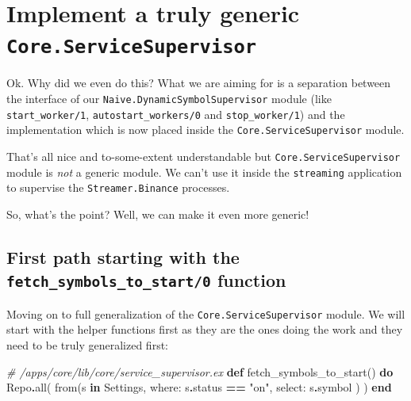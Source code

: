 \documentclass[
  oneside]{book}
\newenvironment{Shaded}{\begin{snugshade}}{\end{snugshade}}
\newcommand{\CommentTok}[1]{\textcolor[rgb]{0.56,0.35,0.01}{\textit{#1}}}
\newcommand{\ConstantTok}[1]{\textcolor[rgb]{0.00,0.00,0.00}{#1}}
\newcommand{\KeywordTok}[1]{\textcolor[rgb]{0.13,0.29,0.53}{\textbf{#1}}}
\newcommand{\NormalTok}[1]{#1}
\newcommand{\OperatorTok}[1]{\textcolor[rgb]{0.81,0.36,0.00}{\textbf{#1}}}
\newcommand{\StringTok}[1]{\textcolor[rgb]{0.31,0.60,0.02}{#1}}
\newcommand{\VariableTok}[1]{\textcolor[rgb]{0.00,0.00,0.00}{#1}}
\begin{document}
\hypertarget{implement-a-truly-generic-core.servicesupervisor}{%
\section{\texorpdfstring{Implement a truly generic \texttt{Core.ServiceSupervisor}}{Implement a truly generic Core.ServiceSupervisor}}\label{implement-a-truly-generic-core.servicesupervisor}}

Ok. Why did we even do this? What we are aiming for is a separation between the interface of our \texttt{Naive.DynamicSymbolSupervisor} module (like \texttt{start\_worker/1}, \texttt{autostart\_workers/0} and \texttt{stop\_worker/1}) and the implementation which is now placed inside the \texttt{Core.ServiceSupervisor} module.

That's all nice and to-some-extent understandable but \texttt{Core.ServiceSupervisor} module is \emph{not} a generic module. We can't use it inside the \texttt{streaming} application to supervise the \texttt{Streamer.Binance} processes.

So, what's the point? Well, we can make it even more generic!

\hypertarget{first-path-starting-with-the-fetch_symbols_to_start0-function}{%
\subsection{\texorpdfstring{First path starting with the \texttt{fetch\_symbols\_to\_start/0} function}{First path starting with the fetch\_symbols\_to\_start/0 function}}\label{first-path-starting-with-the-fetch_symbols_to_start0-function}}

Moving on to full generalization of the \texttt{Core.ServiceSupervisor} module. We will start with the helper functions first as they are the ones doing the work and they need to be truly generalized first:

\begin{Shaded}
\begin{Highlighting}[]
  \CommentTok{\# /apps/core/lib/core/service\_supervisor.ex}
  \KeywordTok{def}\NormalTok{ fetch\_symbols\_to\_start() }\KeywordTok{do}
    \ConstantTok{Repo}\OperatorTok{.}\NormalTok{all(}
\NormalTok{      from(s }\KeywordTok{in} \ConstantTok{Settings}\NormalTok{,}
        \VariableTok{where:}\NormalTok{ s}\OperatorTok{.}\NormalTok{status }\OperatorTok{==} \StringTok{"on"}\NormalTok{,}
        \VariableTok{select:}\NormalTok{ s}\OperatorTok{.}\NormalTok{symbol}
\NormalTok{      )}
\NormalTok{    )}
  \KeywordTok{end}
\end{Highlighting}
\end{Shaded}
\end{document}
